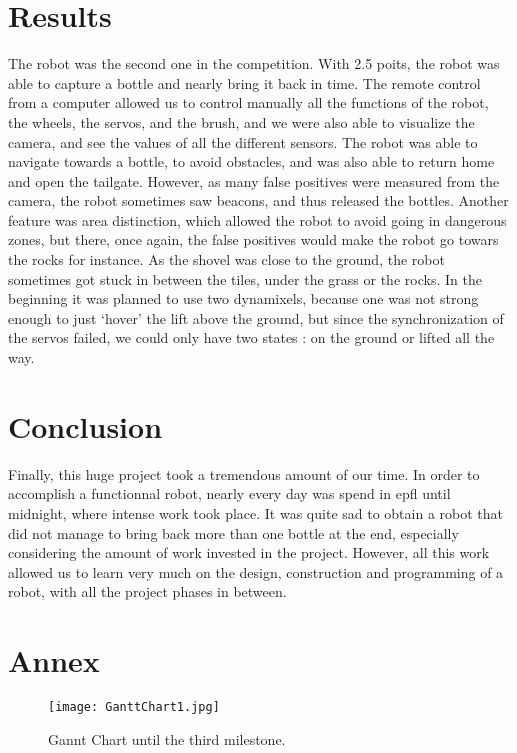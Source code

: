 \chapter{Results}
The robot was the second one in the competition. With 2.5 poits, the robot was able to capture a bottle and nearly bring it back in time. The remote control from a computer allowed us to control manually all the functions of the robot, the wheels, the servos, and the brush, and we were also able to visualize the camera, and see the values of all the different sensors. The robot was able to navigate towards a bottle, to avoid obstacles, and was also able to return home and open the tailgate. However, as many false positives were measured from the camera, the robot sometimes saw beacons, and thus released the bottles. Another feature was area distinction, which allowed the robot to avoid going in dangerous zones, but there, once again, the false positives would make the robot go towars the rocks for instance. As the shovel was close to the ground, the robot sometimes got stuck in between the tiles, under the grass or the rocks. In the beginning it was planned to use two dynamixels, because one was not strong enough to just `hover' the lift above the ground, but since the synchronization of the servos failed, we could only have two states : on the ground or lifted all the way.

\chapter{Conclusion}
Finally, this huge project took a tremendous amount of our time. In order to accomplish a functionnal robot, nearly every day was spend in epfl until midnight, where intense work took place. It was quite sad to obtain a robot that did not manage to bring back more than one bottle at the end, especially considering the amount of work invested in the project. However, all this work allowed us to learn very much on the design, construction and programming of a robot, with all the project phases in between.

\chapter{Annex}

\begin{figure}[H]
  \centering
  \texttt{[image: GanttChart1.jpg]}
  \caption{Gannt Chart until the third milestone.}
\label{fig:gannt1}
\end{figure}

